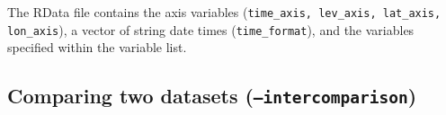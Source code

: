 \documentclass{article}
\begin{document}
%
%
%


The RData file contains the axis variables (\texttt{time\_axis, lev\_axis, lat\_axis, lon\_axis}), a vector of string date times (\texttt{time\_format}), and the variables specified within the variable list. 

\subsection{Comparing two datasets (\texttt{--intercomparison})}
\end{document}
